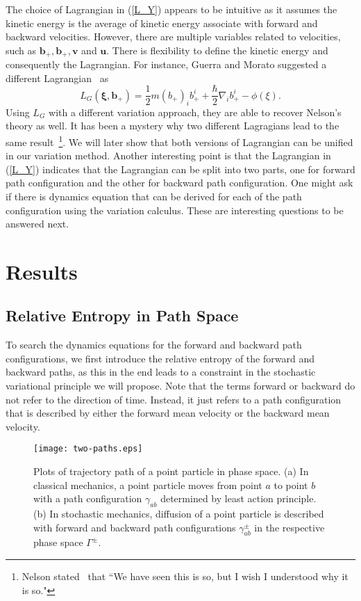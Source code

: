 \documentclass[%
 aip, 
 amsmath,amssymb,amsthm,
 nofootinbib,
 reprint,
]{revtex4-1}
\begin{document}
The choice of Lagrangian in (\ref{L_Y}) appears to be intuitive as it assumes the kinetic energy is the average of kinetic energy associate with forward and backward velocities. However, there are multiple variables related to velocities, such as $\mathbf{b_+}, \mathbf{b_+}, \mathbf{v}$ and $\mathbf{u}$. There is flexibility to define the kinetic energy and consequently the Lagrangian. For instance, Guerra and Morato suggested a different Lagrangian~\cite{Guerra} as
\begin{equation}
    \label{L_G}
    L_G(\mathbf{\xi, b_+}) = \frac{1}{2}m(b_+)_ib_+^i + \frac{\hbar}{2}\nabla_ib_+^i - \phi(\xi).
\end{equation}
Using $L_G$ with a different variation approach, they are able to recover Nelson's theory as well. It has been a mystery why two different Lagragians lead to the same result~\footnote{Nelson stated~\cite{Nelsonbook} that ``We have seen this is so, but I wish I understood why it is so."}. We will later show that both versions of Lagrangian can be unified in our variation method. Another interesting point is that the Lagrangian in (\ref{L_Y}) indicates that the Lagrangian can be split into two parts, one for forward path configuration and the other for backward path configuration. One might ask if there is dynamics equation that can be derived for each of the path configuration using the variation calculus. These are interesting questions to be answered next. 

\section{Results}
\label{sec:results}
\subsection{Relative Entropy in Path Space}
\label{subsec:relH}
To search the dynamics equations for the forward and backward path configurations, we first introduce the relative entropy of the forward and backward paths, as this in the end leads to a constraint in the stochastic variational principle we will propose. Note that the terms forward or backward do not refer to the direction of time. Instead, it just refers to a path configuration that is described by either the forward mean velocity or the backward mean velocity.

\begin{figure*}
\begin{center}
\texttt{[image: two-paths.eps]}
\caption{Plots of trajectory path of a point particle in phase space. (a) In classical mechanics, a point particle moves from point $a$ to point $b$ with a path configuration $\gamma_{ab}$ determined by least action principle. (b) In stochastic mechanics, diffusion of a point particle is described with forward and backward path configurations $\gamma^{\pm}_{ab}$ in the respective phase space $\Gamma^{\pm}$.}
\label{fig:1}       %
\end{center}
\end{figure*}
\end{document}
